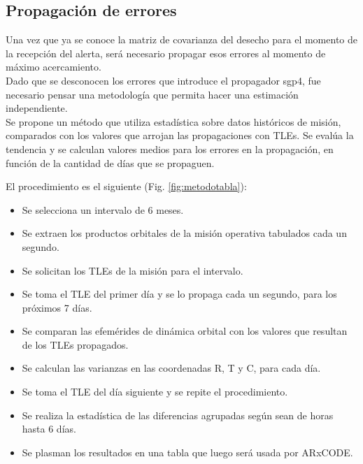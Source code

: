 \subsection{Propagaci\'on de errores}\label{subsec:tablaprop}
Una vez que ya se conoce la matriz de covarianza del desecho para el momento de la recepci\'on del alerta, ser\'a necesario propagar esos errores al momento de m\'aximo acercamiento.\\
Dado que se desconocen los errores que introduce el propagador sgp4, fue necesario pensar una metodolog\'ia que permita hacer una estimaci\'on independiente.\\
Se propone un m\'etodo que utiliza estad\'istica sobre datos hist\'oricos de misi\'on, comparados con los valores que arrojan las propagaciones con TLEs. Se eval\'ua la tendencia y se calculan valores medios para los errores en la propagaci\'on, en funci\'on de la cantidad de d\'ias que se propaguen.

\vspace{3cm}
El procedimiento es el siguiente (Fig. \ref{fig:metodotabla}):
\begin{itemize}
\itemsep0em
\item Se selecciona un intervalo de 6 meses.
\item Se extraen los productos orbitales de la misi\'on operativa tabulados cada un segundo.
\item Se solicitan los TLEs de la misi\'on para el intervalo.
\item Se toma el TLE del primer d\'ia y se lo propaga cada un segundo, para los pr\'oximos 7 d\'ias.
\item Se comparan las efem\'erides de din\'amica orbital con los valores que resultan de los TLEs propagados.
\item Se calculan las varianzas en las coordenadas R, T y C, para cada d\'ia.
\item Se toma el TLE del d\'ia siguiente y se repite el procedimiento.
\item Se realiza la estad\'istica  de las diferencias agrupadas seg\'un sean de horas hasta 6 d\'ias.
\item Se plasman los resultados en una tabla que luego ser\'a usada por ARxCODE.
\end{itemize}


